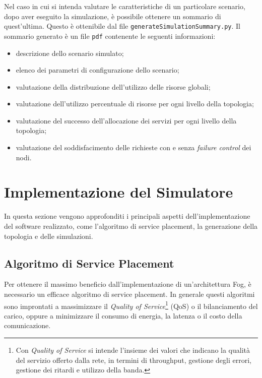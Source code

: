 Nel caso in cui si intenda valutare le caratteristiche di un particolare scenario, dopo aver eseguito la simulazione, è possibile ottenere un sommario di quest'ultima. Questo è ottenibile dal file \texttt{generateSimulationSummary.py}. Il sommario generato è un file \texttt{pdf} contenente le seguenti informazioni:
\begin{itemize}
	\item descrizione dello scenario simulato;
	\item elenco dei parametri di configurazione dello scenario;
	\item valutazione della distribuzione dell'utilizzo delle risorse globali;
	\item valutazione dell'utilizzo percentuale di risorse per ogni livello della topologia;
	\item valutazione del successo dell'allocazione dei servizi per ogni livello della topologia;
	\item valutazione del soddisfacimento delle richieste con e senza \textit{failure control} dei nodi.
\end{itemize}

\section{Implementazione del Simulatore}

In questa sezione vengono approfonditi i principali aspetti dell'implementazione del software realizzato, come l'algoritmo di service placement, la generazione della topologia e delle simulazioni.

\subsection{Algoritmo di Service Placement}

Per ottenere il massimo beneficio dall'implementazione di un'architettura Fog, è necessario un efficace algoritmo di service placement. In generale questi algoritmi sono improntati a massimizzare il \textit{Quality of Service}\footnote{Con \textit{Quality of Service} si intende l'insieme dei valori che indicano la qualità del servizio offerto dalla rete, in termini di throughput, gestione degli errori, gestione dei ritardi e utilizzo della banda.} (QoS) o il bilanciamento del carico, oppure a minimizzare il consumo di energia, la latenza o il costo della comunicazione.

